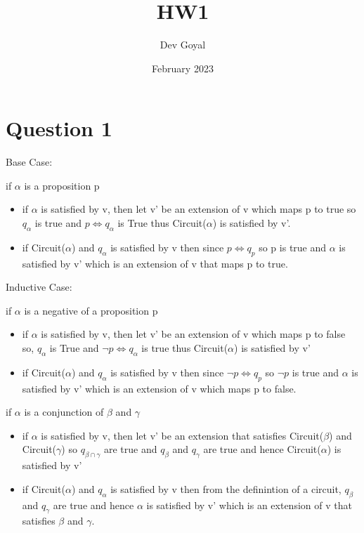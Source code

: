 \documentclass{article}
\title{HW1}
\author{Dev Goyal }
\date{February 2023}
\begin{document}
\maketitle

\section{Question 1}

Base Case:

if $\alpha$ is a proposition p
\begin{itemize}
    \item if $\alpha$ is satisfied by v, then let v' be an extension of v which maps p to true so $q_{\alpha}$ is true and $p \iff q_{\alpha}$ is True thus Circuit($\alpha$) is satisfied by v'.
    \item if Circuit($\alpha$) and $q_{\alpha}$ is satisfied by v then since $p \iff q_{p}$ so p is true and $\alpha$ is satisfied by v' which is an extension of v that maps p to true.
\end{itemize}

Inductive Case:

if $\alpha$ is a negative of a proposition p
\begin{itemize}
    \item if $\alpha$ is satisfied by v, then let v' be an extension of v which maps p to false so, $q_{\alpha}$ is True and $\neg p \iff q_{\alpha}$ is true thus Circuit($\alpha$) is satisfied by v'
    \item if Circuit($\alpha$) and $q_{\alpha}$ is satisfied by v then since $\neg p \iff q_{p}$ so $\neg p$ is true and $\alpha$ is satisfied by v' which is an extension of v which maps p to false.
\end{itemize}

if $\alpha$ is a conjunction of $\beta$ and $\gamma$

\begin{itemize}
    \item if $\alpha$ is satisfied by v, then let v' be an extension that satisfies Circuit($\beta$) and Circuit($\gamma$) so $q_{\beta \cap \gamma}$ are true and $q_\beta$ and $q_\gamma$ are true and hence Circuit($\alpha$) is satisfied by v' 
    \item if Circuit($\alpha$) and $q_{\alpha}$ is satisfied by v then from the definintion of a circuit, $q_{\beta}$ and $q_\gamma$ are true and hence $\alpha$ is satisfied by v' which is an extension of v that satisfies $\beta$ and $\gamma$.
\end{itemize}
\end{document}
